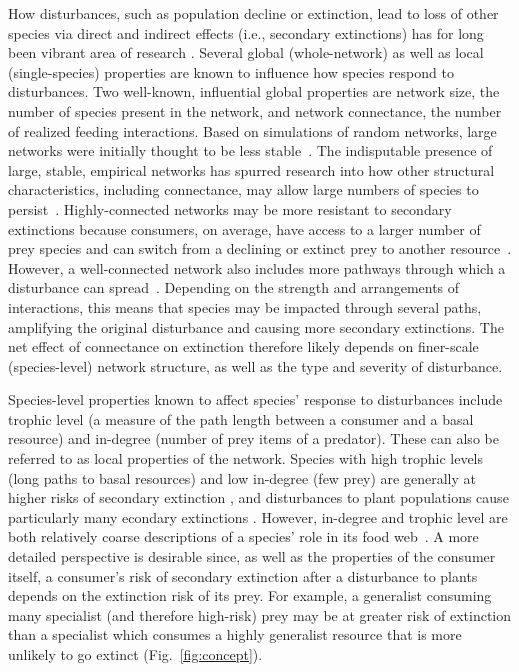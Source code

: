 \documentclass[12pt]{article}
\begin{document}
\begin{spacing}{2.0}
    How disturbances, such as population decline or extinction, lead to loss of other species via direct and indirect effects (i.e., secondary extinctions) has for long been vibrant area of research \citep{Santos2021,curtsdotter2011robustness, dunne2009cascading, Eklof2006}.
    Several global (whole-network) as well as local (single-species) properties are known to influence how species respond to disturbances. Two well-known, influential global properties are network size, the number of species present in the network, and network connectance, the number of realized feeding interactions.
    Based on simulations of random networks, large networks were initially thought to be less stable~\citep{May1972}.
    The indisputable presence of large, stable, empirical networks has spurred research into how other structural characteristics, including connectance, may allow large numbers of species to persist~\citep{Dunne2002}.
    Highly-connected networks may be more resistant to secondary extinctions because consumers, on average, have access to a larger number of prey species and can switch from a declining or extinct prey to another resource~\citep{Dunne2002, Eklof2006,Baumgartner2015}. However, a well-connected network also includes more pathways through which a disturbance can spread~\citep{Dunne2004, Vieira2015}. Depending on the strength and arrangements of interactions, this means that species may be impacted through several paths, amplifying the original disturbance and causing more secondary extinctions.
    The net effect of connectance on extinction therefore likely depends on finer-scale (species-level) network structure, as well as the type and severity of disturbance.
    
    
    Species-level properties known to affect species' response to disturbances include trophic level (a measure of the path length between a consumer and a basal resource) and in-degree (number of prey items of a predator). 
    These can also be referred to as local properties of the network.
    Species with high trophic levels (long paths to basal resources) and low in-degree (few prey) are generally at higher risks of secondary extinction \citep{binzer2011susceptibility, Eklof2006}, and disturbances to plant populations cause particularly many econdary extinctions \citep{Curtsdotter2011}. %
    However, in-degree and trophic level are both relatively coarse descriptions of a species' role in its food web~\citep{Cirtwill2018FoodWebs}. 
    A more detailed perspective is desirable since, as well as the properties of the consumer itself, a consumer's risk of secondary extinction after a disturbance to plants depends on the extinction risk of its prey.
    For example, a generalist consuming many specialist (and therefore high-risk) prey may be at greater risk of extinction than a specialist which consumes a highly generalist resource that is more unlikely to go extinct (Fig.~\ref{fig:concept}).



\end{spacing}
\end{document}
